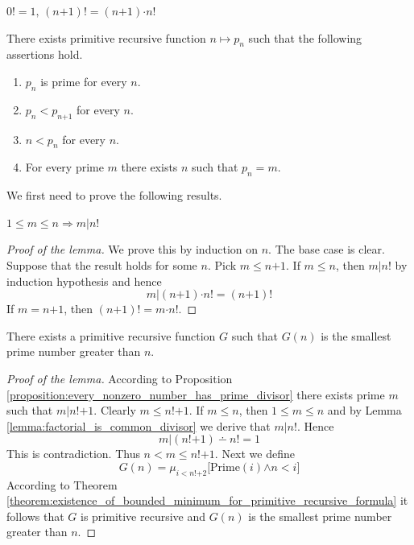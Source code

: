 \documentclass[10pt]{amsart}
\newcommand{\mra}{\boldsymbol{\Rightarrow}}
\newcommand{\mand}{\boldsymbol{\wedge}}
\newcommand{\mle}{\boldsymbol{<}}
\newcommand{\mleq}{\boldsymbol{\leq}}
\newcommand{\meq}{\boldsymbol{=}}
\newcommand{\mplus}{\boldsymbol{+}}
\newcommand{\mdot}{\boldsymbol{\cdot}}
\newcommand{\theoremlabels}[2]{#1][#2}
\begin{document}
\begin{definition}
	$0! \meq 1,\,(n\mplus1)! \meq (n\mplus1)\mdot n!$
\end{definition}

\begin{theorem}[\theoremlabels{$\mathrm{PRA}$}{Euclid}]\label{theorem:prime_number_sequence}
	There exists primitive recursive function $n \mapsto p_n$ such that the following assertions hold.
	\begin{enumerate}[label=\emph{\textbf{(\arabic*)}}, leftmargin=3.0em]
		\item $p_n$ is prime for every $n$.
		\item $p_n \mle p_{n\mplus1}$ for every $n$.
		\item $n \mle p_n$ for every $n$.
		\item For every prime $m$ there exists $n$ such that $p_n \meq m$.
	\end{enumerate}
\end{theorem}
\noindent
We first need to prove the following results.

\begin{lemma}\label{lemma:factorial_is_common_divisor}
	$1 \mleq m \mleq n \mra m|n!$
\end{lemma}
\begin{proof}[Proof of the lemma]
	We prove this by induction on $n$. The base case is clear. Suppose that the result holds for some $n$. Pick $m \mleq n \mplus 1$. If $m \mleq n$, then $m|n!$ by induction hypothesis and hence
	$$m|(n\mplus1)\mdot n! \meq (n\mplus1)!$$
	If $m \meq n \mplus 1$, then $(n\mplus1)! \meq m\mdot n!$.
\end{proof}

\begin{lemma}\label{lemma:prime_number_greater_than_given_number}
	There exists a primitive recursive function $G$ such that $G(n)$ is the smallest prime number greater than $n$.
\end{lemma}
\begin{proof}[Proof of the lemma]
	According to Proposition \ref{proposition:every_nonzero_number_has_prime_divisor} there exists prime $m$ such that $m|n! \mplus 1$. Clearly $m \mleq n! \mplus 1$. If $m \mleq n$, then $1\mleq m \mleq n$ and by Lemma \ref{lemma:factorial_is_common_divisor} we derive that $m|n!$. Hence
	$$m|(n! \mplus 1) \dotminus n! \meq 1$$
	This is contradiction. Thus $n \mle m \mleq n! \mplus 1$. Next we define
	$$G(n) \meq \mu_{i \mle n! \mplus 2}\big[\mathrm{Prime}(i) \mand n \mle i\big]$$
	According to Theorem \ref{theorem:existence_of_bounded_minimum_for_primitive_recursive_formula} it follows that $G$ is primitive recursive and $G(n)$ is the smallest prime number greater than $n$.
\end{proof}
\end{document}
